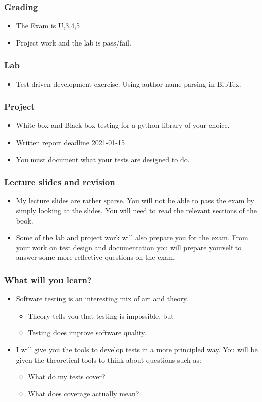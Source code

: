 \documentclass{beamer}
\begin{document}
\begin{frame}
  \frametitle{Grading}
  \begin{itemize}
  \item The Exam is U,3,4,5
  \item Project work and the lab is pass/fail.
  \end{itemize}
\end{frame}
\begin{frame}
  \frametitle{Lab}
  \begin{itemize}
  \item Test driven development exercise. Using author name parsing in
    BibTex. 
  \end{itemize}
\end{frame}
\begin{frame}
  \frametitle{Project}
  \begin{itemize}
  \item White box and Black box testing for a python library of your choice.
  \item Written report deadline 2021-01-15
  \item You must document what your tests are designed to do.
  \end{itemize}
\end{frame}
\begin{frame}
  \frametitle{Lecture slides and revision}
  \begin{itemize}
  \item My lecture slides are rather sparse. You will not be able to
    pass the exam by simply looking at the slides. You will need to
    read the relevant sections of the book. 
\item Some of the lab and project work will also prepare you for the
  exam. From your work on test design and documentation you will
  prepare yourself to answer some more reflective questions on the exam.
  \end{itemize}
\end{frame}
\begin{frame}
  \frametitle{What will you learn?}
  \begin{itemize}
  \item Software testing is an interesting mix of art and theory.
    \begin{itemize}
    \item Theory tells you that testing is impossible, but
    \item Testing does improve software quality.
    \end{itemize}
  \item I will give you the tools to develop tests in a more
    principled way. You will be given the theoretical tools to think
    about questions such as:
    \begin{itemize}
    \item What do my tests cover?
    \item What does coverage actually mean? 
    \end{itemize}
  \end{itemize}
\end{frame}
\end{document}
